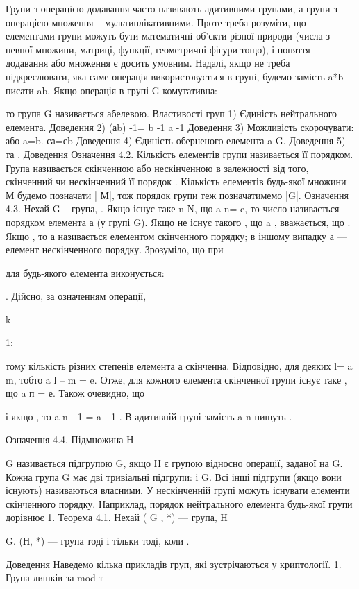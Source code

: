 Групи з операцією додавання часто називають адитивними
групами, а групи з операцією множення – мультиплікативними.
Проте треба розуміти, що елементами групи можуть бути
математичні об’єкти різної природи (числа з певної множини,
матриці, функції, геометричні фігури тощо), і поняття додавання
або множення є досить умовним.
Надалі, якщо не треба підкреслювати, яка саме операція
використовується в групі, будемо замість a*b писати ab.
Якщо операція в групі
G
комутативна:


то група
G
називається абелевою.
Властивості груп
1) Єдиність нейтрального елемента.
Доведення
2) (аb)
-1= b
-1 a
-1
Доведення
3) Можливість скорочувати: 
 або  a=b.
 са=сb
Доведення
4) Єдиність оберненого елемента
a
G.
Доведення
5)  та .
Доведення
 Означення 4.2. Кількість елементів групи називається її
порядком. Група називається скінченною або нескінченною в
залежності від того, скінченний чи нескінченний її порядок .
Кількість елементів будь-якої множини М будемо позначати | М|,
тож порядок групи теж позначатимемо |G|.
Означення 4.3. Нехай G – група, . Якщо існує таке n N,
що a
n= e, то число  називається порядком
елемента а (у групі G). Якщо не існує такого , що a
 ,
вважається, що . Якщо  , то а називається
елементом скінченного порядку; в іншому випадку а --- елемент
нескінченного порядку.
Зрозуміло, що при 

для будь-якого елемента 
виконується:

. Дійсно, за означенням операції,

k

1:

тому кількість різних степенів елемента а скінченна.
Відповідно, для деяких
l= a
m, тобто a
l – m = e. Отже,
для кожного елемента скінченної групи існує таке , що a
п = е.
Також очевидно, що 

і якщо , то a
n - 1 = a - 1
.
В адитивній групі замість a
n пишуть .

Означення 4.4. Підмножина Н

G називається підгрупою G,
якщо Н є групою відносно операції, заданої на G.
 Кожна група G має дві тривіальні підгрупи:  і G. Всі інші
підгрупи (якщо вони існують) називаються власними.
У нескінченній групі можуть існувати елементи скінченного
порядку. Наприклад, порядок нейтрального елемента будь-якої
групи дорівнює 1.
Теорема 4.1. Нехай (
G
, *) --- група, Н

G. (Н, *) --- група тоді і
тільки тоді, коли .

Доведення
Наведемо кілька прикладів груп, які зустрічаються у криптології.
1. Група лишків за mod т 

